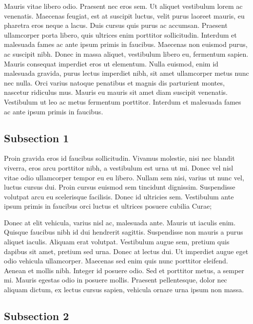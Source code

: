 Mauris vitae libero odio. Praesent nec eros sem. Ut aliquet vestibulum lorem ac venenatis. Maecenas feugiat, est at suscipit luctus, velit purus laoreet mauris, eu pharetra eros neque a lacus. Duis cursus quis purus ac accumsan. Praesent ullamcorper porta libero, quis ultrices enim porttitor sollicitudin. Interdum et malesuada fames ac ante ipsum primis in faucibus. Maecenas non euismod purus, ac suscipit nibh. Donec in massa aliquet, vestibulum libero eu, fermentum sapien. Mauris consequat imperdiet eros ut elementum. Nulla euismod, enim id malesuada gravida, purus lectus imperdiet nibh, sit amet ullamcorper metus nunc nec nulla. Orci varius natoque penatibus et magnis dis parturient montes, nascetur ridiculus mus. Mauris eu mauris sit amet diam suscipit venenatis. Vestibulum ut leo ac metus fermentum porttitor. Interdum et malesuada fames ac ante ipsum primis in faucibus.

\subsection{Subsection 1}\label{subsec:subsection-1-2}

Proin gravida eros id faucibus sollicitudin. Vivamus molestie, nisi nec blandit viverra, eros arcu porttitor nibh, a vestibulum est urna ut mi. Donec vel nisl vitae odio ullamcorper tempor eu eu libero. Nullam sem nisi, varius ut nunc vel, luctus cursus dui. Proin cursus euismod sem tincidunt dignissim. Suspendisse volutpat arcu eu scelerisque facilisis. Donec id ultricies sem. Vestibulum ante ipsum primis in faucibus orci luctus et ultrices posuere cubilia Curae;

Donec at elit vehicula, varius nisl ac, malesuada ante. Mauris ut iaculis enim. Quisque faucibus nibh id dui hendrerit sagittis. Suspendisse non mauris a purus aliquet iaculis. Aliquam erat volutpat. Vestibulum augue sem, pretium quis dapibus sit amet, pretium sed urna. Donec at lectus dui. Ut imperdiet augue eget odio vehicula ullamcorper. Maecenas sed enim quis nunc porttitor eleifend. Aenean et mollis nibh. Integer id posuere odio. Sed et porttitor metus, a semper mi. Mauris egestas odio in posuere mollis. Praesent pellentesque, dolor nec aliquam dictum, ex lectus cursus sapien, vehicula ornare urna ipsum non massa.

\subsection{Subsection 2}\label{subsec:subsection-2-2}

